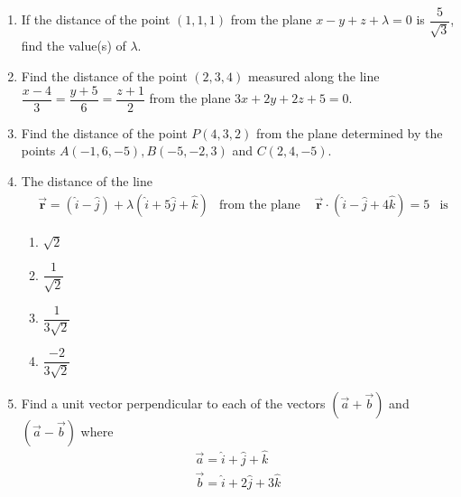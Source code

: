 %
\begin{enumerate}
\item If the distance of the point $(1,1,1)$ from the plane $x-y+z+\lambda=0$ is $\dfrac{5}{\sqrt{3}}$, find the value(s) of $\lambda$.
\item Find the distance of the point $(2,3,4)$ measured along the line $\dfrac{x-4}{3}=\dfrac{y+5}{6}=\dfrac{z+1}{2}$ from the plane $3x+2y+2z+5=0$.
\item Find the distance of the point $P(4,3,2)$ from the plane determined by the points $A(-1,6,-5),B(-5,-2,3)$ and $C(2,4,-5)$.
\item The distance of the line 
	\begin{align}
		&\overrightarrow{\textbf{r}}=(\hat{i}-\hat{j})+\lambda(\hat{i}+5\hat{j}+\hat{k})&\textrm{from the plane } &\overrightarrow{\textbf{r}}\cdot(\hat{i}-\hat{j}+4\hat{k})=5& \textrm{is}
	\end{align}
\begin{enumerate}
\item $\sqrt{2}$
\item $\dfrac{1}{\sqrt{2}}$
\item $\dfrac{1}{3\sqrt{2}}$
\item $\dfrac{-2}{3\sqrt{2}}$
\end{enumerate}
\item Find a unit vector perpendicular to each of the vectors $(\overrightarrow{a}+\overrightarrow{b})$ and $(\overrightarrow{a}-\overrightarrow{b})$ where 
	\begin{align}
		&\overrightarrow{a}=\hat{i}+\hat{j}+\hat{k}&\\&\overrightarrow{b}=\hat{i}+2\hat{j}+3\hat{k}&
\end{align}
\end{enumerate}
%

